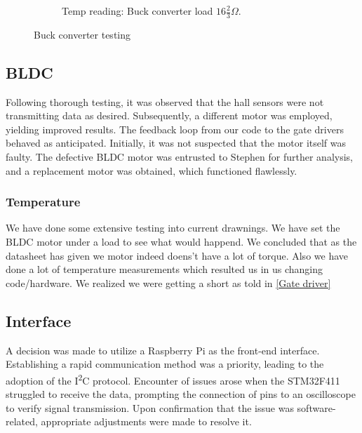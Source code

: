 \begin{figure}[H]
\begin{subfigure}{0.3\textwidth}
    \caption{Temp reading: Buck converter load \(16\frac{2}{3}\Omega\).}
    \label{fig:BuckLoad}
    \end{subfigure}
    \hfill
  \label{fig:Buck}
  \caption{Buck converter testing}
\end{figure}



\subsection{BLDC}\label{BLDC}
Following thorough testing, it was observed that the hall sensors were not transmitting data as desired. Subsequently, a different motor was employed, yielding improved results. The feedback loop from our code to the gate drivers behaved as anticipated. Initially, it was not suspected that the motor itself was faulty. The defective BLDC motor\cite{reichelt-motor-datasheet} was entrusted to Stephen for further analysis, and a replacement motor was obtained, which functioned flawlessly.
\subsubsection{Temperature}
We have done some extensive testing into current drawnings. We have set the BLDC motor\cite{reichelt-motor-datasheet} under a load to see what would happend. We concluded that as the datasheet has given we motor indeed doens't have a lot of torque. Also we have done a lot of temperature measurements which resulted us in us changing code/hardware. We realized we were getting a short as told in \autoref{Gate driver}

\subsection{Interface}\label{Interface}
A decision was made to utilize a Raspberry Pi\cite{raspberrypi-3b} as the front-end interface\cite{sossolutions-7inch-touchscreen}. Establishing a rapid communication method was a priority, leading to the adoption of the I\textsuperscript{2}C protocol. Encounter of issues arose when the STM32F411\cite{stm32-base-board} struggled to receive the data, prompting the connection of pins to an oscilloscope to verify signal transmission. Upon confirmation that the issue was software-related, appropriate adjustments were made to resolve it.


